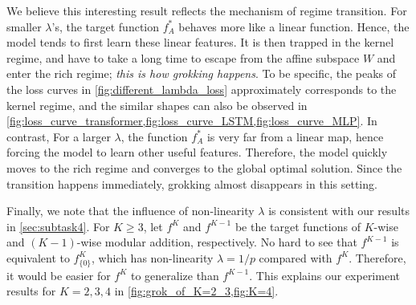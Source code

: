 We believe this interesting result reflects the mechanism of regime transition.
For smaller $\lambda$'s, the target function $f_A^*$ behaves more like a linear function.
Hence, the model tends to first learn these linear features.
It is then trapped in the kernel regime, and have to take a long time to escape from the affine subspace $W$ and enter the rich regime;
\emph{this is how grokking happens}.
To be specific, the peaks of the loss curves in \cref{fig:different_lambda_loss} approximately corresponds to the kernel regime, and the similar shapes can also be observed in \cref{fig:loss_curve_transformer,fig:loss_curve_LSTM,fig:loss_curve_MLP}.
In contrast, For a larger $\lambda$, the function $f_A^*$ is very far from a linear map, hence forcing the model to learn other useful features.
Therefore, the model quickly moves to the rich regime and converges to the global optimal solution.
Since the transition happens immediately, grokking almost disappears in this setting.

Finally, we note that the influence of non-linearity $\lambda$ is consistent with our results in \cref{sec:subtask4}.
For $K \geq 3$, let $f^K$ and $f^{K-1}$ be the target functions of $K$-wise and $(K-1)$-wise modular addition, respectively.
No hard to see that $f^{K-1}$ is equivalent to $f^K_{\{0\}}$, which has non-linearity $\lambda = 1/p$ compared with $f^K$.
Therefore, it would be easier for $f^K$ to generalize than $f^{K-1}$.
This explains our experiment results for $K = 2, 3, 4$ in \cref{fig:grok_of_K=2_3,fig:K=4}.